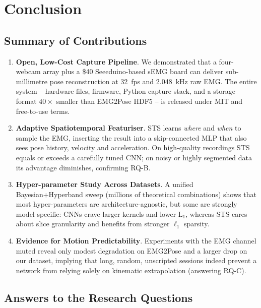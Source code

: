 \chapter{Conclusion}
\label{chap:conclusion}

\section{Summary of Contributions}

\begin{enumerate}[label=\arabic*.]

\item \textbf{Open, Low-Cost Capture Pipeline}.
      We demonstrated that a four-webcam array plus a \$40 Seeeduino-based
      sEMG board can deliver sub-millimetre pose reconstruction at
      \SI{32}{fps} and \SI{2.048}{kHz} raw EMG.
      The entire system -- hardware files, firmware, Python capture stack, and a
      storage format \(40\times\) smaller than EMG2Pose HDF5 -- is released
      under MIT and free-to-use terms.

\item \textbf{Adaptive Spatiotemporal Featuriser}.
      STS learns \emph{where} and \emph{when} to sample the EMG, inserting the
      result into a skip-connected MLP that also sees pose history, velocity
      and acceleration. On high-quality recordings STS equals or exceeds a
      carefully tuned CNN; on noisy or highly segmented data its advantage
      diminishes, confirming RQ-B.

\item \textbf{Hyper-parameter Study Across Datasets}.
      A unified Bayesian+Hyperband sweep (millions of theoretical combinations)
      shows that most hyper-parameters are architecture-agnostic, but some are
      strongly model-specific: CNNs crave larger kernels and lower L\(_1\),
      whereas STS cares about slice granularity and benefits from stronger
      \(\ell_1\) sparsity.

\item \textbf{Evidence for Motion Predictability}.
      Experiments with the EMG channel muted reveal only modest degradation on
      EMG2Pose and a larger drop on our dataset, implying that long, random,
      unscripted sessions indeed prevent a network from relying solely on
      kinematic extrapolation (answering RQ-C).

\end{enumerate}

\section*{Answers to the Research Questions}

